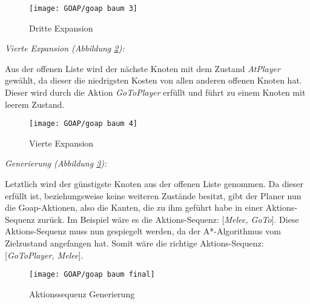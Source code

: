 \begin{figure}[h]
  \centering
  \texttt{[image: GOAP/goap baum 3]}
	\captionsetup{justification=justified, format=plain}
  \caption{Dritte Expansion}
  \label{fig:goap3}
\end{figure}

\clearpage

\textit{Vierte Expansion (Abbildung \ref{fig:goap4}):}

Aus der offenen Liste wird der n\"{a}chste Knoten mit dem Zustand \textit{AtPlayer} gew\"{a}hlt, da dieser die niedrigsten Kosten von allen anderen offenen Knoten hat. Dieser wird durch die Aktion \textit{GoToPlayer} erf\"{u}llt und f\"{u}hrt zu einem Knoten mit leerem Zustand.

\begin{figure}[h]
  \centering
  \texttt{[image: GOAP/goap baum 4]}
	\captionsetup{justification=justified, format=plain}
  \caption{Vierte Expansion}
  \label{fig:goap4}
\end{figure}

\clearpage

\textit{Generierung (Abbildung \ref{fig:goap5}):}

Letztlich wird der g\"{u}nstigste Knoten aus der offenen Liste genommen. Da dieser erf\"{u}llt ist, beziehungsweise keine weiteren Zust\"{a}nde besitzt, gibt der Planer nun die Goap-Aktionen, also die Kanten, die zu ihm gef\"{u}hrt habe in einer Aktions-Sequenz zur\"{u}ck. Im Beispiel w\"{a}re es die Aktions-Sequenz: [\textit{Melee, GoTo}]. Diese Aktions-Sequenz muss nun gespiegelt werden, da der A*-Algorithmus vom Zielzustand angefangen hat. Somit w\"{a}re die richtige Aktions-Sequenz: [\textit{GoToPlayer, Melee}].

\begin{figure}[h]
  \centering
  \texttt{[image: GOAP/goap baum final]}
	\captionsetup{justification=justified, format=plain}
  \caption{Aktionssequenz Generierung}
  \label{fig:goap5}
\end{figure}
